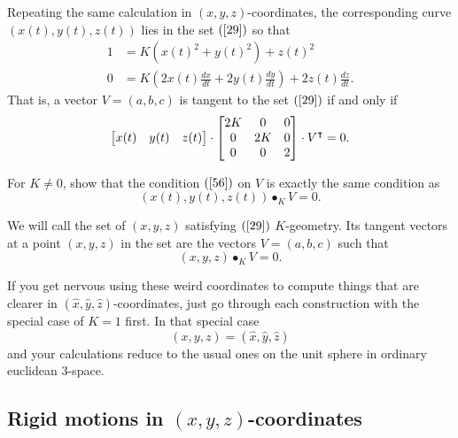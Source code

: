 \documentclass{ximera}
\begin{document}
Repeating the same calculation in $\left(  x,y,z\right)  $-coordinates, the
corresponding curve $\left(  x\left(  t\right)  ,y\left(  t\right)  ,z\left(
t\right)  \right)  $ lies in the set $\left(  \ref{29}\right)  $ so that%
\begin{align*}
1  &  =K\left(  x\left(  t\right)  ^{2}+y\left(  t\right)  ^{2}\right)
+z\left(  t\right)  ^{2}\\
0  &  =K\left(  2x\left(  t\right)  \frac{dx}{dt}+2y\left(  t\right)
\frac{dy}{dt}\right)  +2z\left(  t\right)  \frac{dz}{dt}.
\end{align*}
That is, a vector $V=\left(  a,b,c\right)  $ is tangent to the set $\left(
\ref{29}\right)  $ if and only if%
\begin{equation}
\begin{bmatrix}
x(t) & y(t) & z(t)
\end{bmatrix}
\cdot
\begin{bmatrix}
2K & 0 & 0\\
0 & 2K & 0\\
0 & 0 & 2
\end{bmatrix}
\cdot V^\transpose=0. \label{56}%
\end{equation}


\begin{problem}
\label{82}For $K\neq0$, show that the condition $\left(  \ref{56}\right)  $ on
$V$ is exactly the same condition as%
\[
\left(  x\left(  t\right)  ,y\left(  t\right)  ,z\left(  t\right)  \right)
\bullet_{K}V=0.
\]

\end{problem}

We will call the set of $\left( x,y,z\right) $ satisfying $\left(
\ref{29}\right) $ $K$-geometry. Its tangent vectors at a point $\left(
x,y,z\right) $ in the set are the vectors $V=\left( a,b,c\right) $
such that%
\[
\left(  x,y,z\right)  \bullet_{K}V=0.
\]


If you get nervous using these weird coordinates to compute things
that are clearer in $\left( \hat{x},\hat{y},\hat{z}\right)
$-coordinates, just go through each construction with the special case
of $K=1$ first.  In that special case
\[
\left(  x,y,z\right)  =\left(  \hat{x},\hat{y},\hat{z}\right)
\]
and your calculations reduce to the usual ones on the unit sphere in
ordinary euclidean $3$-space.

\subsection*{Rigid motions in $\left(  x,y,z\right)  $-coordinates}
\end{document}

